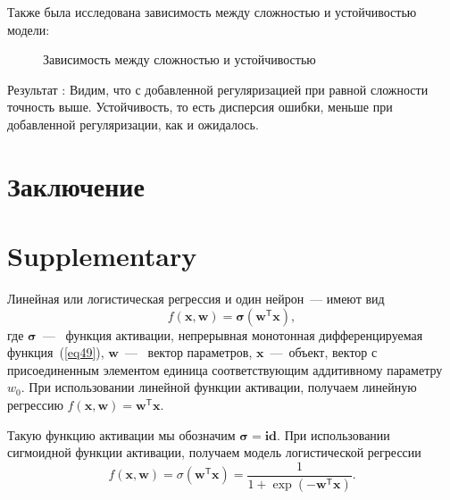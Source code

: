 \documentclass[12pt, twoside]{article}
\newcommand{\xb}{{\mathbf{x}}}
\newcommand{\sigmab}{{\boldsymbol{\sigma}}}
\newcommand{\wm}{{\mathbf{w}}}
\begin{document}
    
Также была исследована зависимость между сложностью и устойчивостью модели:
      \begin{figure}[h!]
\caption{Зависимость между сложностью и устойчивостью}
\end{figure}



Результат : Видим, что с добавленной регуляризацией при равной сложности точность выше. Устойчивость, то есть дисперсия ошибки, меньше при добавленной регуляризации, как и ожидалось.
\section{Заключение}


\section{Supplementary}

Линейная или логистическая регрессия и один нейрон~--- имеют вид
\begin{equation}\label{eq11}
f(\xb,\wm)=\sigmab(\wm^\mathsf{T}\xb),
\end{equation}
где $\sigmab$~---~ функция активации, непрерывная монотонная дифференцируемая функция~(\ref{eq49}),  $\wm$~---~ вектор параметров, $\xb$~---~объект, вектор с присоединенным элементом единица соответствующим аддитивному параметру $w_0$. При использовании линейной функции активации,  получаем линейную регрессию $f(\xb,\wm)=\wm^\mathsf{T}\xb.$

Такую функцию активации мы обозначим $\sigmab = \textbf{id} $. При использовании сигмоидной функции активации,  получаем модель логистической регрессии \begin{equation}\label{eq49}
f(\xb,\wm)=\sigma(\wm^\mathsf{T}\xb)=\frac{1}{1+\exp(-\wm^\mathsf{T}\xb)} .
\end{equation}
\end{document}
